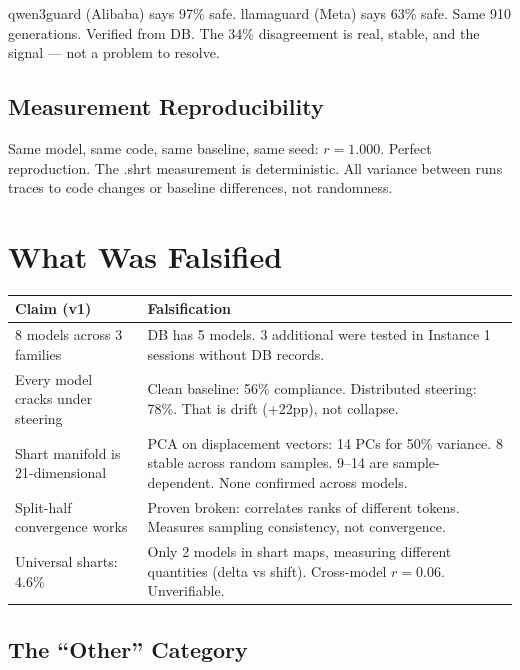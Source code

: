 \documentclass[11pt,a4paper]{article}
\begin{document}
qwen3guard (Alibaba) says 97\% safe. llamaguard (Meta) says 63\% safe. Same 910 generations. Verified from DB. The 34\% disagreement is real, stable, and the signal --- not a problem to resolve.

\subsection{Measurement Reproducibility}

Same model, same code, same baseline, same seed: $r = 1.000$. Perfect reproduction. The .shrt measurement is deterministic. All variance between runs traces to code changes or baseline differences, not randomness.

\section{What Was Falsified}

\begin{center}
\begin{longtable}{p{5cm}p{8cm}}
\toprule
\textbf{Claim (v1)} & \textbf{Falsification} \\
\midrule
\endhead
8 models across 3 families & DB has 5 models. 3 additional were tested in Instance 1 sessions without DB records. \\
Every model cracks under steering & Clean baseline: 56\% compliance. Distributed steering: 78\%. That is drift (+22pp), not collapse. \\
Shart manifold is 21-dimensional & PCA on displacement vectors: 14 PCs for 50\% variance. 8 stable across random samples. 9--14 are sample-dependent. None confirmed across models. \\
Split-half convergence works & Proven broken: correlates ranks of different tokens. Measures sampling consistency, not convergence. \\
Universal sharts: 4.6\% & Only 2 models in shart maps, measuring different quantities (delta vs shift). Cross-model $r = 0.06$. Unverifiable. \\
\bottomrule
\end{longtable}
\end{center}

\subsection{The ``Other'' Category}
\end{document}
